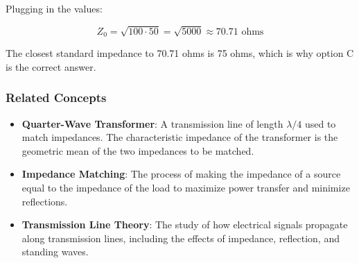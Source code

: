 Plugging in the values:

\[
Z_0 = \sqrt{100 \cdot 50} = \sqrt{5000} \approx 70.71 \text{ ohms}
\]

The closest standard impedance to 70.71 ohms is 75 ohms, which is why option C is the correct answer.

\subsubsection{Related Concepts}
\begin{itemize}
    \item \textbf{Quarter-Wave Transformer}: A transmission line of length \( \lambda/4 \) used to match impedances. The characteristic impedance of the transformer is the geometric mean of the two impedances to be matched.
    \item \textbf{Impedance Matching}: The process of making the impedance of a source equal to the impedance of the load to maximize power transfer and minimize reflections.
    \item \textbf{Transmission Line Theory}: The study of how electrical signals propagate along transmission lines, including the effects of impedance, reflection, and standing waves.
\end{itemize}

